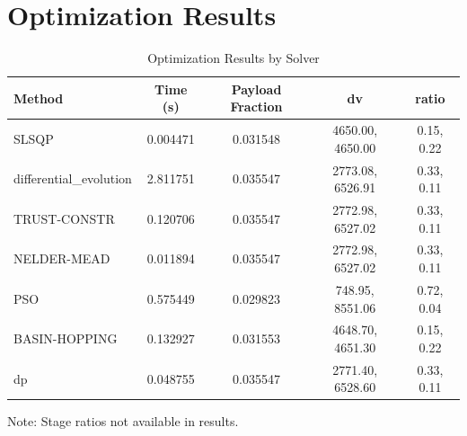 \documentclass{article}
\begin{document}
\section{Optimization Results}
\begin{table}[H]
\centering
\caption{Optimization Results by Solver}
\small
\begin{tabular}{lcccc}
\toprule
\midrule
Method & Time (s) & Payload Fraction & dv & ratio \\
\midrule
SLSQP & 0.004471 & 0.031548 & 4650.00, 4650.00 & 0.15, 0.22 \\
differential\_evolution & 2.811751 & 0.035547 & 2773.08, 6526.91 & 0.33, 0.11 \\
TRUST-CONSTR & 0.120706 & 0.035547 & 2772.98, 6527.02 & 0.33, 0.11 \\
NELDER-MEAD & 0.011894 & 0.035547 & 2772.98, 6527.02 & 0.33, 0.11 \\
PSO & 0.575449 & 0.029823 & 748.95, 8551.06 & 0.72, 0.04 \\
BASIN-HOPPING & 0.132927 & 0.031553 & 4648.70, 4651.30 & 0.15, 0.22 \\
dp & 0.048755 & 0.035547 & 2771.40, 6528.60 & 0.33, 0.11 \\
\midrule
\bottomrule
\end{tabular}

\end{table}
Note: Stage ratios not available in results.
\end{document}
